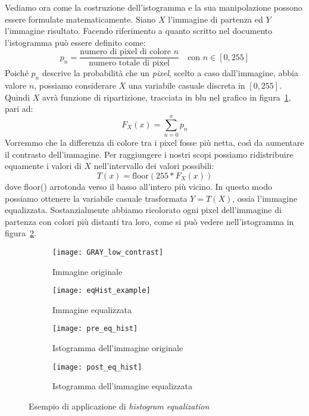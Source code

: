 Vediamo ora come la costruzione dell'istogramma e la sua manipolazione possono essere formulate matematicamente.
Siano $X$ l'immagine di partenza ed $Y$ l'immagine risultato.
Facendo riferimento a quanto scritto nel documento~\cite{hist-eq} l'istogramma può essere definito come:
\begin{equation*}
p_n = \frac{\text{numero di pixel di colore $n$}}{\text{numero totale di pixel}} \quad \text{con $n$} \in [0,255]
\end{equation*}
Poiché $p_n$ descrive la probabilità che un \textit{pixel}, scelto a caso dall'immagine, abbia valore $n$, possiamo considerare $X$ una variabile casuale discreta in $[0,255]$.
Quindi $X$ avrà funzione di ripartizione, tracciata in blu nel grafico in figura~\ref{fig:hist_pre_eq_example}, pari ad:
\begin{equation*}
  F_X(x) = \sum_{n=0}^{x} p_n
\end{equation*}
Vorremmo che la differenza di colore tra i pixel fosse più netta, così da aumentare il contrasto dell'immagine.
Per raggiungere i nostri scopi possiamo ridistribuire equamente i valori di $X$ nell'intervallo dei valori possibili:
\begin{equation*}
  T(x) = \text{floor}(255 * F_X(x))
\end{equation*}
dove floor() arrotonda verso il basso all'intero più vicino.
In questo modo possiamo ottenere la variabile casuale trasformata $Y=T(X)$, ossia l'immagine equalizzata.
Sostanzialmente abbiamo ricolorato ogni pixel dell'immagine di partenza con colori più distanti tra loro, come si può vedere nell'istogramma in figura~\ref{fig:hist_post_eq_example}.

\clearpage
\begin{figure}[ht]
  \begin{center}
  \begin{subfigure}{.49\linewidth}
    \centering\texttt{[image: GRAY\_low\_contrast]}
    \caption{Immagine originale}
  \end{subfigure}
  \begin{subfigure}{.49\linewidth}
    \centering\texttt{[image: eqHist\_example]}
    \caption{Immagine equalizzata}
  \end{subfigure}
  \begin{subfigure}{.73\linewidth}
    \centering\texttt{[image: pre\_eq\_hist]}
    \caption{Istogramma dell'immagine originale}
    \label{fig:hist_pre_eq_example}
  \end{subfigure}
  \begin{subfigure}{.73\linewidth}
    \centering\texttt{[image: post\_eq\_hist]}
    \caption{Istogramma dell'immagine equalizzata}
    \label{fig:hist_post_eq_example}
  \end{subfigure}
  \end{center}
  \caption{Esempio di applicazione di \textit{histogram equalization}}
    \label{fig:hist_eq_example}
\end{figure}

